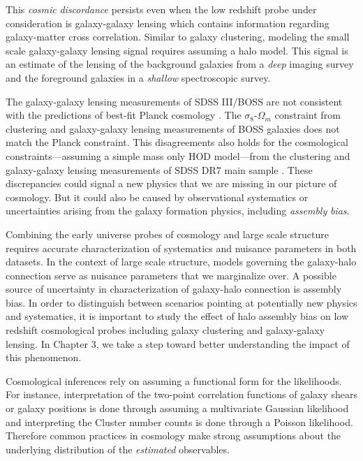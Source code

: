 This \emph{cosmic} \emph{discordance} persists even when the low redshift probe under consideration is galaxy-galaxy lensing which contains information regarding galaxy-matter cross correlation. Similar to galaxy clustering, modeling the small scale galaxy-galaxy lensing signal requires assuming a halo model. 
This signal is an estimate of the lensing of the background galaxies from a \emph{deep} imaging survey and the foreground galaxies in a \emph{shallow} spectroscopic survey.

The galaxy-galaxy lensing measurements of SDSS III/BOSS \citep{miyatake15,lensingislow} are not consistent with the predictions of best-fit Planck cosmology \citep{planckII}.
The $\sigma_{8}$-$\Omega_{m}$ constraint from clustering and galaxy-galaxy lensing measurements of BOSS galaxies \citep{more15} does not match the Planck constraint.
This disagreements also holds for the cosmological constraints---assuming a simple mass only HOD model---from the clustering and galaxy-galaxy lensing measurements of SDSS DR7 main sample \citep{cacciato13}. These discrepancies could signal a new physics that we are missing in our picture of cosmology. But it could also be caused by observational systematics or uncertainties arising from the galaxy formation physics, including \emph{assembly} \emph{bias}.

Combining the early universe probes of cosmology and large scale structure requires accurate 
characterization of systematics and nuisance parameters in both datasets. In the context of large scale 
structure, models governing the galaxy-halo connection serve as nuisance parameters that we marginalize over. A possible source of uncertainty in characterization of galaxy-halo connection is assembly bias. In order to distinguish between scenarios pointing at potentially new physics and systematics, it is important to study the effect of halo assembly bias on low redshift cosmological probes including galaxy clustering and galaxy-galaxy lensing. In Chapter 3, we take a step toward better understanding the impact of this phenomenon. 

Cosmological inferences rely on assuming a functional form for the likelihoods. For instance, interpretation of the 
two-point correlation functions of galaxy shears or galaxy positions is done through assuming a multivariate Gaussian likelihood 
and interpreting the Cluster number counts is done through a Poisson likelihood. Therefore common practices in 
cosmology make strong assumptions about the underlying distribution of the \emph{estimated} observables.

